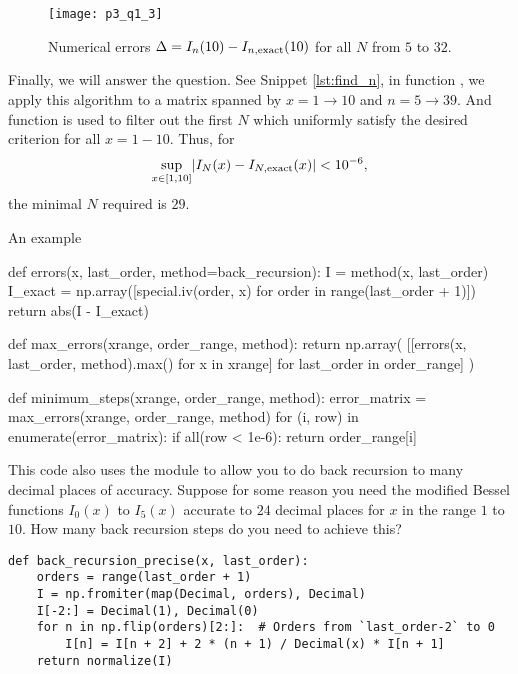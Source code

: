 \begin{figure}
    \centering
    \texttt{[image: p3\_q1\_3]}
    \caption{Numerical errors $\Delta = I_n(10) - I_{n,\textnormal{exact}}(10)$
        for all $N$ from $5$ to $32$.}
    \label{fig:plot_errors_10}
\end{figure}

Finally, we will answer the question. See Snippet \ref{lst:find_n},
in function , we apply this algorithm to a matrix spanned by
$x = 1 \to 10$ and $n = 5 \to 39$.
And function  is used to filter out the first $N$ which uniformly
satisfy the desired criterion for all $x = 1 - 10$.
Thus, for
%
\begin{equation}
    \sup_{x \in [1, 10]} \lvert I_N(x) - I_{N,\textnormal{exact}}(x) \rvert < 10^{-6},
\end{equation}
the minimal $N$ required is $29$.

\begin{algorithm}[H]
    \caption{An example}
    \label{lst:find_n}
    \begin{pythoncode}
        def errors(x, last_order, method=back_recursion):
            I = method(x, last_order)
            I_exact = np.array([special.iv(order, x) for order in range(last_order + 1)])
            return abs(I - I_exact)


        def max_errors(xrange, order_range, method):
            return np.array(
                [[errors(x, last_order, method).max() for x in xrange] for last_order in
                order_range]
            )


        def minimum_steps(xrange, order_range, method):
            error_matrix = max_errors(xrange, order_range, method)
            for (i, row) in enumerate(error_matrix):
                if all(row < 1e-6):
                    return order_range[i]
        \end{pythoncode}
\end{algorithm}

\Question This code also uses the  module to allow you to do back recursion to many
decimal places of accuracy. Suppose for some reason you need the modified Bessel functions
$I_0(x)$ to $I_5(x)$ accurate to $24$ decimal places for $x$ in the range $1$ to $10$. How
many back recursion steps do you need to achieve this?

\begin{verbatim}
def back_recursion_precise(x, last_order):
    orders = range(last_order + 1)
    I = np.fromiter(map(Decimal, orders), Decimal)
    I[-2:] = Decimal(1), Decimal(0)
    for n in np.flip(orders)[2:]:  # Orders from `last_order-2` to 0
        I[n] = I[n + 2] + 2 * (n + 1) / Decimal(x) * I[n + 1]
    return normalize(I)
\end{verbatim}
